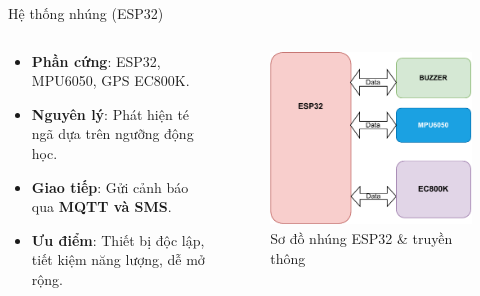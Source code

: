 \begin{frame}{Hệ thống nhúng (ESP32)}
    \begin{columns}[T]
        \begin{column}{0.48\textwidth}
            \begin{itemize}
                \item \textbf{Phần cứng}: ESP32, MPU6050, GPS EC800K.
                \item \textbf{Nguyên lý}: Phát hiện té ngã dựa trên ngưỡng động học.
                \item \textbf{Giao tiếp}: Gửi cảnh báo qua \textbf{MQTT và SMS}.
                \item \textbf{Ưu điểm}: Thiết bị độc lập, tiết kiệm năng lượng, dễ mở rộng.
            \end{itemize}
        \end{column}
        \begin{column}{0.48\textwidth}
            \begin{figure}
                \centering
                \includegraphics[width=\textwidth]{images/module1_block_diagram-crop.pdf}
                \caption{Sơ đồ nhúng ESP32 \& truyền thông}
            \end{figure}
        \end{column}
    \end{columns}
\end{frame}

